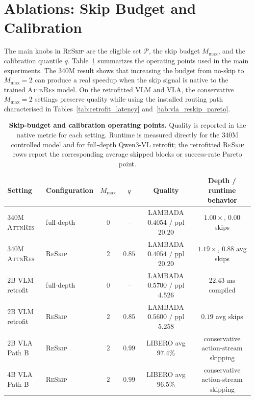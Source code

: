 \documentclass{article}
\newcommand{\attnres}{\textsc{AttnRes}}
\newcommand{\reskip}{\textsc{ReSkip}}
\begin{document}
\section{Ablations: Skip Budget and Calibration}
\label{sec:ablations_main}

The main knobs in \reskip{} are the eligible set $\mathcal{P}$, the skip budget $M_{\max}$, and the calibration quantile $q$. Table~\ref{tab:budget_calibration_main} summarizes the operating points used in the main experiments. The 340M result shows that increasing the budget from no-skip to $M_{\max}{=}2$ can produce a real speedup when the skip signal is native to the trained \attnres{} model. On the retrofitted VLM and VLA, the conservative $M_{\max}{=}2$ settings preserve quality while using the installed routing path characterised in Tables~\ref{tab:retrofit_latency} and~\ref{tab:vla_reskip_pareto}.

\begin{table}[t]
\caption{\textbf{Skip-budget and calibration operating points.} Quality is reported in the native metric for each setting. Runtime is measured directly for the 340M controlled model and for full-depth Qwen3-VL retrofit; the retrofitted \reskip{} rows report the corresponding average skipped blocks or success-rate Pareto point.}
\label{tab:budget_calibration_main}
\centering\small
\setlength{\tabcolsep}{4pt}
\begin{tabular}{llcccc}
\toprule
Setting & Configuration & $M_{\max}$ & $q$ & Quality & Depth / runtime behavior \\
\midrule
340M \attnres{} & full-depth & $0$ & -- & LAMBADA $0.4054$ / ppl $20.20$ & $1.00\times$, $0.00$ skips \\
340M \attnres{} & \reskip{} & $2$ & $0.85$ & LAMBADA $0.4054$ / ppl $20.20$ & $1.19\times$, $0.88$ avg skips \\
2B VLM retrofit & full-depth & $0$ & -- & LAMBADA $0.5700$ / ppl $4.526$ & $22.43$ ms compiled \\
2B VLM retrofit & \reskip{} & $2$ & $0.85$ & LAMBADA $0.5600$ / ppl $5.258$ & $0.19$ avg skips \\
2B VLA Path B & \reskip{} & $2$ & $0.99$ & LIBERO avg $97.4\%$ & conservative action-stream skipping \\
4B VLA Path B & \reskip{} & $2$ & $0.99$ & LIBERO avg $96.5\%$ & conservative action-stream skipping \\
\bottomrule
\end{tabular}
\end{table}
\end{document}
